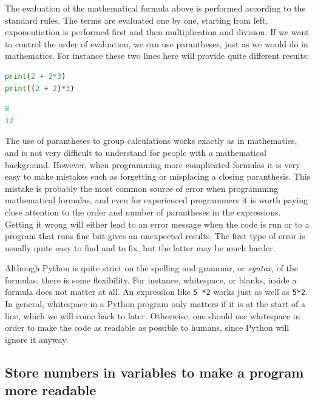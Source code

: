 \documentclass[graybox,envcountchap,sectrefs,final]{svmonodo}
\begin{document}
The evaluation of the mathematical formula above is performed according to the standard rules. The terms are evaluated one by
one, starting from left, exponentiation is performed first and then multiplication and division. If we want to control the
order of evaluation, we can use parantheses, just as we would do in mathematics. For instance these two lines here will
provide quite different results:
\begin{lstlisting}[language=Python,style=blue1bar]
print(2 + 2*3)
print((2 + 2)*3)
\end{lstlisting}
\begin{lstlisting}[language=Python,style=gray]
8
12
\end{lstlisting}
The use of parantheses to group calculations works exactly as in mathematics, and is not very difficult to understand for people with
a mathematical background. However, when programming more complicated formulas it is very easy to make mistakes such as forgetting or misplacing
a closing paranthesis. This mistake is probably the most common source of error when programming mathematical formulas, and even for
experienced programmers it is worth paying close attention to the order and number of parantheses in the expressions. Getting it wrong will
either lead to an error message when the code is run or to a program that runs
fine but gives an unexpected results. The first type of error is usually quite easy to find and to fix, but the latter may be much harder.

Although Python is quite strict on the spelling and grammar, or \emph{syntax}, of the formulas, there is some flexibility. For instance,
whitespace, or blanks, inside a formula does not matter at all. An expression like \texttt{5    *2} works just as well as \texttt{5*2}. In general, whitespace
in a Python program only matters if it is at the start of a line, which we will come back to later. Otherwise, one should use whitespace
in order to make the code as readable as possible to humans, since Python will ignore it anyway.


\subsection{Store numbers in variables to make a program more readable}
\end{document}
